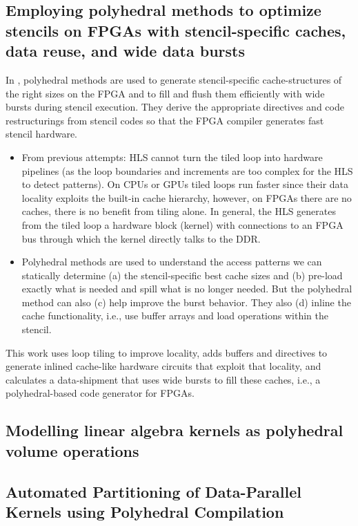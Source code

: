 \documentclass[a4paper, 11pt]{article}
\begin{document}
\subsection{Employing polyhedral methods to optimize stencils on FPGAs with stencil-specific caches, data reuse, and wide data bursts}
In \cite{mayer24-fpgas}, polyhedral methods are used to generate stencil-specific cache-structures of the right sizes on the FPGA and to fill and flush them efficiently with wide bursts during stencil execution. They derive the appropriate directives and code restructurings from stencil codes so that the FPGA compiler generates fast stencil hardware.
\begin{itemize}
    \item From previous attempts: HLS cannot turn the tiled loop into hardware pipelines (as the loop boundaries and increments are too complex for the HLS to detect patterns). On CPUs or GPUs tiled loops run faster since their data locality exploits the built-in cache hierarchy, however, on FPGAs there are no caches, there is no benefit from tiling alone. In general, the HLS generates from the tiled loop a hardware block (kernel) with connections to an FPGA bus through which the kernel directly talks to the DDR.
    \item Polyhedral methods are used to understand the access patterns we can statically determine (a) the stencil-specific best cache sizes and (b) pre-load exactly what is needed and spill what is no longer needed. But the polyhedral method can also (c) help improve the burst behavior. They also (d) inline the cache functionality, i.e., use buffer arrays and load operations within the stencil.
\end{itemize}
This work uses loop tiling to improve locality, adds buffers and directives to generate inlined cache-like hardware circuits that exploit that locality, and calculates a data-shipment that uses wide bursts to fill these caches, i.e., a polyhedral-based code generator for FPGAs.

\subsection{Modelling linear algebra kernels as polyhedral volume operations}

\subsection{Automated Partitioning of Data-Parallel Kernels using Polyhedral Compilation}
\end{document}
